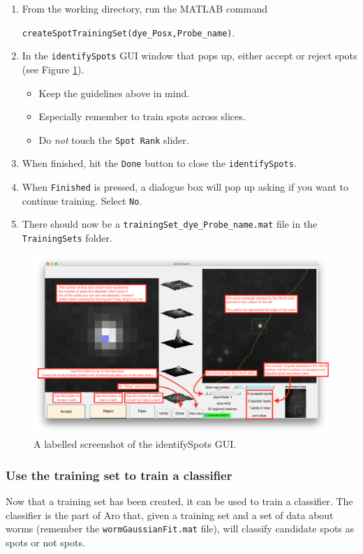 \documentclass[titlepage,11pt]{article}
\begin{document}
\begin{enumerate}
\item From the working directory, run the MATLAB command 

\texttt{createSpotTrainingSet(\textquotesingle dye\_Posx\textquotesingle,\textquotesingle Probe\_name\textquotesingle)}.
\item In the \texttt{identifySpots} GUI window that pops up, either accept or reject spots (see Figure \ref{fig:identifySpotsGUI}).
\begin{itemize}
\item Keep the guidelines above in mind.
\item Especially remember to train spots across slices.
\item Do \emph{not} touch the \texttt{Spot Rank} slider.
\end{itemize}
\item When finished, hit the \texttt{Done} button to close the \texttt{identifySpots}.
\item When \texttt{Finished} is pressed, a dialogue box will pop up asking if you want to continue training. Select \texttt{No}.
\item There should now be a \texttt{trainingSet\_dye\_Probe\_name.mat} file in the \texttt{TrainingSets} folder.
\end{enumerate}

\begin{landscape}
\begin{figure}
\centering
\includegraphics[scale=0.4]{identifySpotsGUI.png}
\caption{A labelled screenshot of the identifySpots GUI.}
\label{fig:identifySpotsGUI}
\end{figure}
\end{landscape}

\subsubsection{Use the training set to train a classifier}
Now that a training set has been created, it can be used to train a classifier. The classifier is the part of Aro that, given a training set and a set of data about worms (remember the \texttt{wormGaussianFit.mat} file), will classify candidate spots as spots or not spots.
\end{document}
